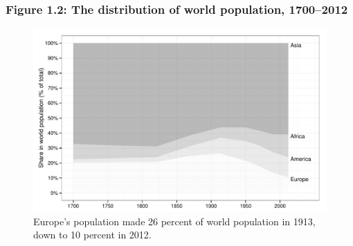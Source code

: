 \documentclass[t]{beamer}\usepackage[]{graphicx}\usepackage[]{color}
\newenvironment{knitrout}{}{} %
\begin{document}
\begin{frame}[label=Figure_1_2]
\frametitle{Figure 1.2: The distribution of world population, 1700--2012}
\begin{figure}[t]
\begin{minipage}[b]{\textwidth}
\centering
\begin{knitrout}\footnotesize
{}\color{fgcolor}

{\centering \includegraphics[width=1\linewidth]{figures/bw/Figure_1_2} 

}



\end{knitrout}
\caption{Europe's population made 26 percent of world population in 1913, down to 10 percent in 2012.}
\end{minipage}
\end{figure}
\end{frame}
\end{document}
